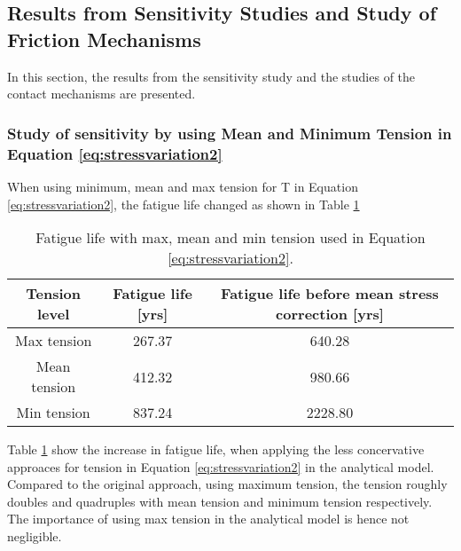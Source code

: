 \subsection{Results from Sensitivity Studies and Study of Friction Mechanisms}
In this section, the results from the sensitivity study and the studies of the contact mechanisms are presented. 
\subsubsection{Study of sensitivity by using Mean and Minimum Tension in Equation \ref{eq:stressvariation2}}
When using minimum, mean and max tension for T in Equation \ref{eq:stressvariation2}, the fatigue life changed as shown in Table \ref{table:maxmin}

\begin{table} [H]
\centering
\begin{tabular}{ |c|c|c|}
\hline
Tension level & Fatigue life [yrs] & Fatigue life before mean stress correction [yrs]\\ 
 \hline
 \hline
    Max tension & 267.37 & 640.28 \\ 
    Mean tension & 412.32 & 980.66 \\ 
    Min tension & 837.24 & 2228.80 \\ 
    \hline
\end{tabular}
\caption{Fatigue life with max, mean and min tension used in Equation \ref{eq:stressvariation2}.}
\label{table:maxmin}
\end{table} 
Table \ref{table:maxmin} show the increase in fatigue life, when applying the less concervative approaces for tension in Equation \ref{eq:stressvariation2} in the analytical model. Compared to the original approach, using maximum tension, the tension roughly doubles and quadruples with mean tension and minimum tension respectively. The importance of using max tension in the analytical model is hence not negligible. 
 
